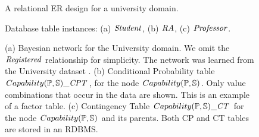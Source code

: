 
\begin{figure}[htbp] %
 \centering
{} 
\caption{A relational ER design for a university domain.}
 \label{fig:university-schema}
\end{figure}
\begin{figure}[htbp] %
 \centering
{} 
\caption{Database table instances: (a) $\student$, (b) $\ra$, (c) $\prof$. }
 \label{fig:instance}
\end{figure}
\begin{figure}[htbp] %
 \centering
{} 
\caption{(a) Bayesian network for the University domain. 
We omit the $\it{Registered}$ relationship for simplicity. 
The network was learned from the University dataset \cite{bib:bbsite}.
(b) Conditional Probability table $Capability(\P,\S)\_\cptable$, for the node $Capability(\P,\S)$. Only value combinations that occur in the data are shown. This is an example of a factor table. (c) Contingency Table $Capability(\P,\S)\_\cttable$ for the node $Capability(\P,\S)$ and its parents. Both CP and CT tables are stored in an RDBMS.}
 \label{fig:pbn}
\label{fig:ct-cp-table}
\end{figure}

